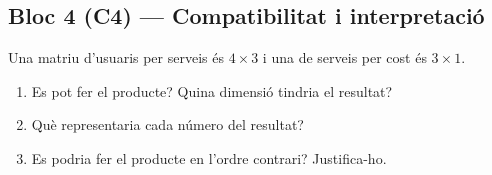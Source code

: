 \subsection{Bloc 4 (C4) — Compatibilitat i interpretació}

\begin{exercicis}
\begin{exlist}
  \item Una matriu d'usuaris per serveis és $4\times 3$ i una de serveis per cost
        és $3\times 1$.
        \begin{enumerate}[label=\alph*), leftmargin=1.6em, topsep=2pt]
          \item Es pot fer el producte? Quina dimensió tindria el resultat?
          \item Què representaria cada número del resultat?
          \item Es podria fer el producte en l'ordre contrari? Justifica-ho.
        \end{enumerate}
\end{exlist}
\end{exercicis}

